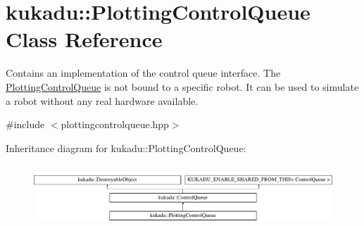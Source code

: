 \hypertarget{classkukadu_1_1PlottingControlQueue}{\section{kukadu\-:\-:Plotting\-Control\-Queue Class Reference}
\label{classkukadu_1_1PlottingControlQueue}
}


Contains an implementation of the control queue interface. The \hyperlink{classkukadu_1_1PlottingControlQueue}{Plotting\-Control\-Queue} is not bound to a specific robot. It can be used to simulate a robot without any real hardware available.  




{\ttfamily \#include $<$plottingcontrolqueue.\-hpp$>$}

Inheritance diagram for kukadu\-:\-:Plotting\-Control\-Queue\-:\begin{figure}[H]
\begin{center}
\leavevmode
\includegraphics[height=2.301370cm]{classkukadu_1_1PlottingControlQueue}
\end{center}
\end{figure}
